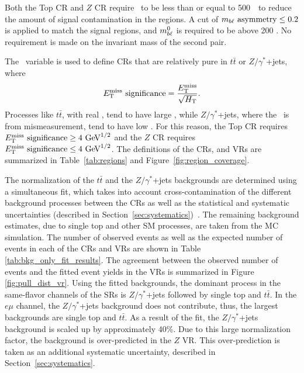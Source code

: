 Both the Top CR and $Z$ CR require \HT\ to be less than or equal to
500~\GeV\ to reduce the amount of
signal contamination in the regions. A cut of $m_{b\ell}~\mathrm{asymmetry} \leq 0.2$ is applied to
match the signal regions, and $m_{b\ell}^0$ is required to be above 200 \GeV. No
requirement is made on the invariant mass of the second pair.

The \METSIG\ variable is used to define CRs that are relatively pure 
in $t\bar{t}$ or $Z/\gamma^{*}$+jets, where
\begin{equation}
  E_{\mathrm{T}}^{\mathrm{miss}}~\text{significance} = \frac{E_{\mathrm{T}}^{\mathrm{miss}}}{\sqrt{H_{\mathrm{T}}}}.
\end{equation}
Processes like $t\bar{t}$, with real \MET, tend to have large \METSIG, while
$Z/\gamma^{*}$+jets, where the \MET\ is from mismeasurement, tend to
have low \METSIG. For this reason, the Top CR requires 
$\METSIG \geq 4 \GeV^{1/2}$ and the $Z$ CR requires
$\METSIG \leq 4 \GeV^{1/2}$.  
The definitions of the CRs, and VRs are summarized in
Table~\ref{tab:regions} and Figure~\ref{fig:region_coverage}.

The normalization of the $t\bar{t}$ and the $Z/\gamma^{*}$+jets backgrounds are
determined using a simultaneous fit, which takes into account
cross-contamination of the different background processes between the
CRs as well as the statistical and systematic
uncertainties (described in Section~\ref{sec:systematics})~\cite{Baak:2014wma}.
The remaining background estimates, due to  single top and other SM processes,
are taken from the MC simulation.
The number of observed events as well as the expected number
of events in each of the CRs and VRs are shown in
Table \ref{tab:bkg_only_fit_results}.
The agreement between the observed number of events and the fitted event
yields in the VRs is summarized in Figure \ref{fig:pull_dist_vr}.
Using the fitted backgrounds, the dominant process in the same-flavor
channels of the SRs is $Z/\gamma^{*}$+jets followed by single top and
$t\bar{t}$. In the $e\mu$ channel, the $Z/\gamma^{*}$+jets background does
not contribute, thus, the largest backgrounds are single top and $t\bar{t}$.
As a result of the fit, the $Z/\gamma^{*}$+jets background is scaled up by
approximately 40\%. Due to this large normalization factor, the background is
over-predicted in the $Z$ VR. This over-prediction is taken as an additional
systematic uncertainty, described in Section~\ref{sec:systematics}.

